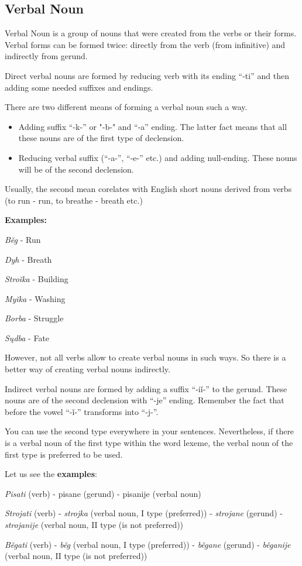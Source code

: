 \subsection{Verbal Noun}

Verbal Noun is a group of nouns that were created from the verbs or their forms. Verbal forms can be formed twice: directly from the verb (from infinitive) and indirectly from gerund.

Direct verbal nouns are formed by reducing verb with its ending “-ti” and then adding some needed suffixes and endings.

There are two different means of forming a verbal noun such a way.

\begin{itemize}
	\item Adding suffix “-k-” or "-b-" and “-a” ending. The latter fact means that all these nouns are of the first type of declension. 
	\item Reducing verbal suffix (“-a-”,  “-e-” etc.) and adding null-ending. These nouns will be of the second declension.
\end{itemize}

Usually, the second mean corelates with English short nouns derived from verbs (to run - run, to breathe - breath etc.)

\textbf{Examples:}

\textit{Běg} - Run

\textit{Dyh} - Breath

\textit{Stroǐka} - Building

\textit{Myǐka} - Washing

\textit{Borba} - Struggle 

\textit{Sųdba} - Fate

However, not all verbs allow to create verbal nouns in such ways. So there is a better way of creating verbal nouns indirectly.

Indirect verbal nouns are formed by adding a suffix “-iǐ-” to the gerund. These nouns are of the second declension with “-je” ending. Remember the fact that before the vowel “-ǐ-” transforms into “-j-”. 

You can use the second type everywhere in your sentences. Nevertheless, if there is a verbal noun of the first type within the word lexeme, the verbal noun of the first type is preferred to be used.

Let us see the \textbf{examples}:

\textit{Pisati} (verb) - pisane (gerund) - pisanije (verbal noun)

\textit{Strojati} (verb) - \textit{strojka} (verbal noun, I type (preferred)) - \textit{strojane} (gerund) - \textit{strojanije} (verbal noun, II type (is not preferred))

\textit{Běgati} (verb) - \textit{běg} (verbal noun, I type (preferred)) - \textit{běgane} (gerund) - \textit{běganije} (verbal noun, II type (is not preferred))  

